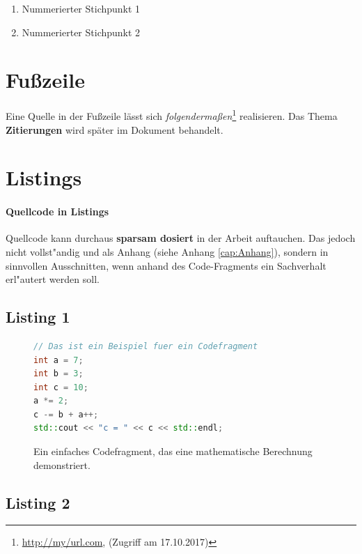 \begin{enumerate}
\item Nummerierter Stichpunkt 1
\item Nummerierter Stichpunkt 2
\end{enumerate}


\section{Fu{\ss}zeile}
\label{sec:Fusszeile}

Eine Quelle in der Fußzeile lässt sich \textit{folgendermaßen}\footnote{\url{http://my/url.com}, (Zugriff am 17.10.2017)} realisieren. Das Thema \textbf{Zitierungen} wird später im Dokument behandelt.

\section{Listings}
\label{sec:Listings}

\paragraph{Quellcode in Listings}
Quellcode kann durchaus \textbf{sparsam dosiert} in der Arbeit auftauchen.
Das jedoch nicht vollst"andig und als Anhang (siehe Anhang \ref{cap:Anhang}), sondern in sinnvollen Ausschnitten, wenn anhand des Code-Fragments ein Sachverhalt erl"autert werden soll.

\subsection{Listing 1}
\label{subsec:Listing1}

\FloatBarrier
\begin{figure}[htb]
\begin{lstlisting}[language=C++, breaklines=true, basicstyle=\small, numbers=none]
// Das ist ein Beispiel fuer ein Codefragment
int a = 7;
int b = 3;
int c = 10;
a *= 2;
c -= b + a++;
std::cout << "c = " << c << std::endl;
\end{lstlisting}
  \caption[Beispiel eines einfachen Codefragments.]{Ein einfaches Codefragment, das eine mathematische Berechnung demonstriert.}
\label{lst:Codefragment}
\end{figure}


\subsection{Listing 2}
\label{subsec:Listing 2}

